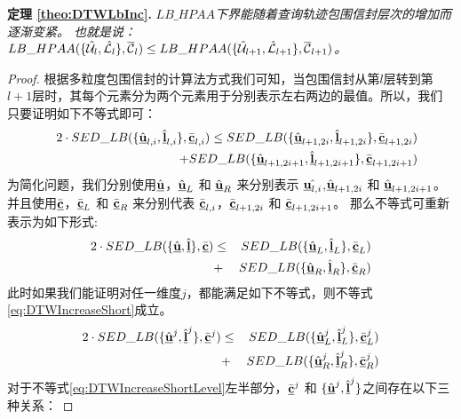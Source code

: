 \textbf{定理 \ref{theo:DTWLbInc}. }{\em 	$LB\_HPAA$下界能随着查询轨迹包围信封层次的增加而逐渐变紧。
	也就是说： $LB\_HPAA({  \{\hat{{\cal U}_{l}}, \hat{{\cal L}_{l}}\},\overline{{\cal C}}_{l}})\le  LB\_HPAA({  \{\hat{{\cal U}}_{l+1}, \hat{\cal L}_{l+1}\},\overline{\cal C}_{l+1}})$。}
\begin{proof}
	根据多粒度包围信封的计算法方式我们可知，当包围信封从第$l$层转到第$l+1$层时，其每个元素分为两个元素用于分别表示左右两边的最值。所以，我们只要证明如下不等式即可：
	\begin{eqnarray}\label{eq:increa}
	&&	2\cdot SED\_LB(\{ \hat{\emph{{\textbf{u}}}}_{l,i}, \hat{\emph{{\textbf{l}}}}_{l,i} \}, \bar{\emph{{\textbf{c}}}}_{l,i}) \le SED\_LB(\{ \hat{\emph{{\textbf{u}}}}_{l+1,2i}, \hat{\emph{{\textbf{l}}}}_{l+1,2i} \}, \bar{\emph{{\textbf{c}}}}_{l+1,2i}) \nonumber \\
	&&\qquad \qquad \qquad \qquad+ SED\_LB(\{ \hat{\emph{{\textbf{u}}}}_{l+1,2i+1}, \hat{\emph{{\textbf{l}}}}_{l+1,2i+1} \}, \bar{\emph{{\textbf{c}}}}_{l+1,2i+1})
	\end{eqnarray}
	为简化问题，我们分别使用$\hat{\emph{{\textbf{u}}}}$，$\hat{\emph{{\textbf{u}}}}_{L} $ 和 $\hat{\emph{{\textbf{u}}}}_{R}$ 来分别表示 $\hat{\emph{{\textbf{u}}}_{l,i}}$,$\hat{\emph{{\textbf{u}}}}_{l+1,2i}$ 和 $\hat{\emph{{\textbf{u}}}}_{l+1,2i+1}$。并且使用$\bar{\emph{{\textbf{c}}}}$，$\bar{\emph{{\textbf{c}}}}_{L}$ 和 $\bar{\emph{{\textbf{c}}}}_{R}$ 来分别代表	$\bar{\emph{{\textbf{c}}}}_{l,i}$，$\bar{\emph{{\textbf{c}}}}_{l+1,2i}$ 和 $\bar{\emph{{\textbf{c}}}}_{l+1,2i+1}$。
那么不等式可重新表示为如下形式:
	\begin{eqnarray}\label{eq:DTWIncreaseShort}
	2\cdot SED\_LB(\{ \hat{\emph{{\textbf{u}}}}, \hat{\emph{{\textbf{l}}}} \}, \bar{\emph{{\textbf{c}}}}) &\le& SED\_LB(\{ \hat{\emph{{\textbf{u}}}}_{L}, \hat{\emph{{\textbf{l}}}}_{L} \}, \bar{\emph{{\textbf{c}}}}_{L})  \nonumber \\ &+& SED\_LB(\{ \hat{\emph{{\textbf{u}}}}_{R}, \hat{\emph{{\textbf{l}}}}_{R} \}, \bar{\emph{{\textbf{c}}}}_{R})
	\end{eqnarray}
	此时如果我们能证明对任一维度$j$，都能满足如下不等式，则不等式\ref{eq:DTWIncreaseShort}成立。
	\begin{eqnarray}\label{eq:DTWIncreaseShortLevel}
	2\cdot SED\_LB(\{ \hat{\emph{{\textbf{u}}}}^{j}, \hat{\emph{{\textbf{l}}}}^{j} \}, \bar{\emph{{\textbf{c}}}}^{j}) &\le& SED\_LB(\{ \hat{\emph{{\textbf{u}}}}_{L}^{j}, \hat{\emph{{\textbf{l}}}}_{L}^{j} \}, \bar{\emph{{\textbf{c}}}}_{L}^{j} )  \nonumber \\ &+& SED\_LB(\{ \hat{\emph{{\textbf{u}}}}_{R}^{j}, \hat{\emph{{\textbf{l}}}}_{R}^{j}  \}, \bar{\emph{{\textbf{c}}}}_{R}^{j})
	\end{eqnarray}
	对于不等式\ref{eq:DTWIncreaseShortLevel}左半部分，$\bar{\emph{{\textbf{c}}}}^{j}$ 和 $\{\hat{\emph{{\textbf{u}}}}^{j},\hat{\emph{{\textbf{l}}}}^{j}\}$之间存在以下三种关系：
	

\end{proof}
